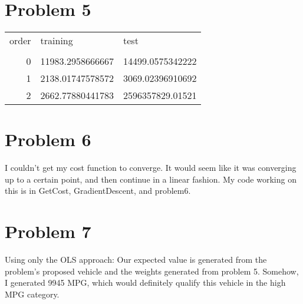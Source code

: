 \documentclass{article}
\begin{document}
\section*{Problem 5}

\begin{center}
\begin{tabular}{rll}
order & training & test \\
\\
0 &	11983.2958666667 & 14499.0575342222 \\
1 & 2138.01747578572 & 3069.02396910692 \\
2 & 2662.77880441783 & 2596357829.01521 \\
\end{tabular}
\end{center}

\section*{Problem 6}
I couldn't get my cost function to converge. It would seem like it was converging up to a certain point, and then continue in a linear fashion.
My code working on this is in GetCost, GradientDescent, and problem6.

\section*{Problem 7}
Using only the OLS approach:
Our expected value is generated from the problem's proposed vehicle and the weights generated from problem 5.
Somehow, I generated 9945 MPG, which would definitely qualify this vehicle in the high MPG category.
\end{document}
